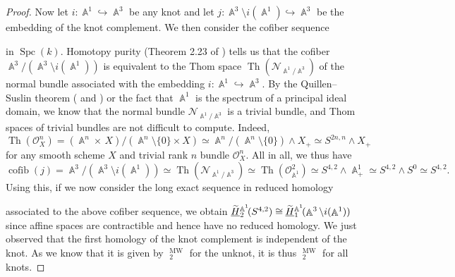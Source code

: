 \documentclass[english]{amsart}
\theoremstyle{definition}
\DeclareMathOperator{\A}{\mathbb{A}}
\DeclareMathOperator{\Spc}{Spc}
\DeclareMathOperator{\KK}{\underline{K}}
\DeclareMathOperator{\MW}{MW}
\DeclareMathOperator{\cofib}{cofib}
\DeclareMathOperator{\Th}{Th}
\begin{document}
\begin{proof}
Now let $i \colon \A^1 \hookrightarrow \A^3$ be any knot and let $j \colon \A^3 \setminus i(\A^1) \hookrightarrow \A^3$ be the embedding of the knot complement. We then consider the cofiber sequence
\begin{center}
\end{center}
in $\Spc(k)$. Homotopy purity (Theorem 2.23 of \cite{MR1813224}) tells us that the cofiber $\A^3 / (\A^3 \setminus i(\A^1))$ is equivalent to the Thom space $\Th(\mathcal{N}_{\A^1/\A^3})$ of the normal bundle associated with the embedding $i \colon \A^1 \hookrightarrow \A^3$. By the Quillen--Suslin theorem (\cite{MR427303} and \cite{MR469905}) or the fact that $\A^1$ is the spectrum of a principal ideal domain, we know that the normal bundle $\mathcal{N}_{\A^1\!/\A^3}$ is a trivial bundle, and Thom spaces of trivial bundles are not difficult to compute. Indeed,
$$\Th(\mathcal{O}^n_X) = (\A^n \times \,X)/(\A^n \setminus \lbrace 0 \rbrace \times X) \simeq \A^n / (\A^n \setminus \lbrace 0 \rbrace) \wedge X_+ \simeq S^{2n,n} \wedge X_+$$
for any smooth scheme $X$ and trivial rank $n$ bundle $\mathcal{O}_X^n$. All in all, we thus have 
$$\cofib(j) = \A^3/(\A^3 \setminus i(\A^1)) \simeq \Th(\mathcal{N}_{\A^1\!/\A^3}) \simeq \Th(\mathcal{O}^2_{\A^1}) \simeq S^{4,2} \wedge \A^1_+ \simeq S^{4,2} \wedge S^0 \simeq S^{4,2}.$$
Using this, if we now consider the long exact sequence in reduced homology 
\begin{center}
\end{center}
associated to the above cofiber sequence, we obtain $\widetilde{\phantom{H}}\hspace{-9.5pt}\underline{H}_2^{\A^1}\!(S^{4,2}) \cong \widetilde{\phantom{H}}\hspace{-9.5pt}\underline{H}_1^{\A^1}\!(\A^3 \setminus i(\A^1))$ since affine spaces are contractible and hence have no reduced homology. We just observed that the first homology of the knot complement is independent of the knot. As we know that it is given by $\KK^{\MW}_2$ for the unknot, it is thus $\KK^{\MW}_2$ for all knots.
\end{proof}
\end{document}
